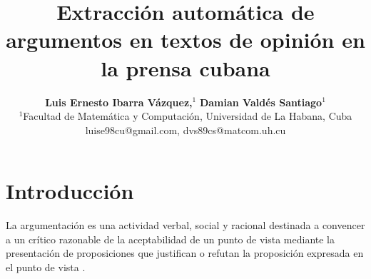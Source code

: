 \documentclass[a4paper,11pt,twocolumn,twoside]{article}
\title{Extracción automática de argumentos en textos de opinión en la prensa cubana}
\author {\textbf{Luis Ernesto Ibarra Vázquez,$^1$} \textbf{Damian Valdés Santiago$^1$}\\
$^1$Facultad de Matemática y Computación, Universidad de La Habana, Cuba\\
luise98cu@gmail.com, dvs89cs@matcom.uh.cu\\
}
\begin{document}

\setlength\titlebox{21cm} %


\label{firstpage} \maketitle

%

\section{Introducción}


La argumentación es una actividad verbal, social y racional destinada a convencer 
a un crítico razonable de la aceptabilidad de un punto de vista mediante la presentación 
de proposiciones que justifican o refutan la proposición expresada 
en el punto de vista \cite{van2004systematic}. 



\end{document}
